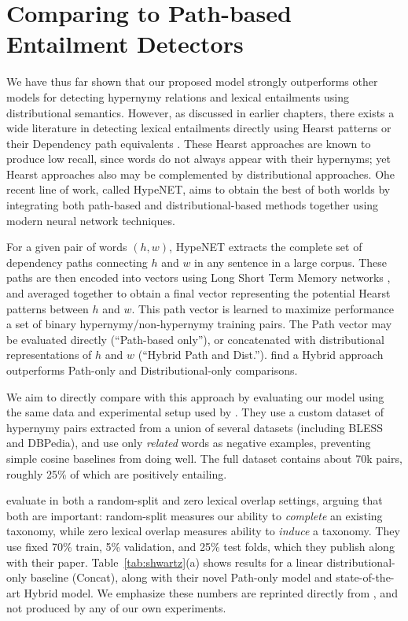 \section{Comparing to Path-based Entailment Detectors}

We have thus far shown that our proposed model strongly outperforms other
models for detecting hypernymy relations and lexical entailments using
distributional semantics. However, as discussed in earlier chapters, there
exists a wide literature in detecting lexical entailments directly using
Hearst patterns \cite{hearst:1992:coling} or their Dependency path
equivalents \cite{snow:2004:nips,girju:2006:cl}. These Hearst approaches are
known to produce low recall, since words do not always appear with their
hypernyms; yet Hearst approaches also may be complemented by distributional
approaches.
Ohe recent line of work, called HypeNET, aims to obtain the best of both
worlds by integrating both path-based and distributional-based methods together
using modern neural network techniques.

For a given pair of words $(h, w)$, HypeNET extracts the complete set of
dependency paths connecting $h$ and $w$ in any sentence in a large corpus.
These paths are then encoded into vectors using Long Short Term Memory networks
\cite{hochreiter:1997:nc}, and averaged together to obtain a final vector
representing the potential Hearst patterns between $h$ and $w$.  This path
vector is learned to maximize performance a set of binary
hypernymy/non-hypernymy training pairs. The Path vector may be evaluated
directly (``Path-based only''), or concatenated with distributional
representations of $h$ and $w$ (``Hybrid Path and Dist.'').
 find a Hybrid approach outperforms Path-only and
Distributional-only comparisons.

We aim to directly compare with this approach by evaluating our model using
the same data and experimental setup used by .
They use a custom dataset of hypernymy pairs extracted from a union of several
datasets (including BLESS and DBPedia), and use only {\em related} words
as negative examples, preventing simple cosine baselines from doing well.
The full dataset contains about 70k pairs, roughly 25\% of which are positively
entailing.

 evaluate in both a random-split and
zero lexical overlap settings, arguing that both are important: random-split
measures our ability to {\em complete} an existing taxonomy, while
zero lexical overlap measures ability to {\em induce} a taxonomy.
They use fixed 70\% train, 5\% validation, and 25\% test folds, which they
publish along with their paper.  Table~\ref{tab:shwartz}(a) shows
results for a linear distributional-only baseline (Concat), along with their
novel Path-only model and state-of-the-art Hybrid model. We emphasize these
numbers are reprinted directly from , and not
produced by any of our own experiments.

